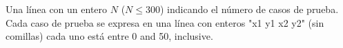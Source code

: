 Una línea con un entero $N$ ($N \leq 300$) indicando el número de casos de prueba.
Cada caso de prueba se expresa en una línea con enteros "x1 y1 x2 y2" (sin comillas) cada uno está entre 0 and 50, inclusive.
